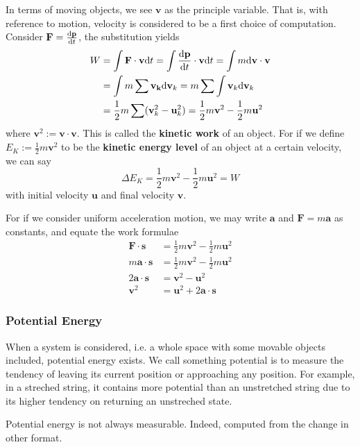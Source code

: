 \documentclass[12pt]{article}
\renewcommand{\d}[1]{\mathrm{d}{#1}}
\begin{document}
    In terms of moving objects, we see $\mathbf{v}$ as the principle variable. That is, with reference to motion, velocity is considered to be a first choice of computation. Consider $\mathbf{F}=\derivative{\mathbf{p}}{t}$, the substitution yields \begin{align*}
        W&=\int \mathbf{F\cdot v} \d{t} = \int \derivative{\mathbf{p}}{t} \cdot \mathbf{v} \d{t} = \int m\d{\mathbf{v}}\cdot \mathbf{v}\\
        &=\int m\sum \mathbf{v_k} \d{\mathbf{v}_k}=m\sum \int \mathbf{v}_k \d{\mathbf{v}_k}\\
        &=\frac{1}{2}m\sum (\mathbf{v}_k^2-\mathbf{u}_k^2) = \frac{1}{2}m\mathbf{v}^2 - \frac{1}{2}m\mathbf{u}^2
    \end{align*}
    where $\mathbf{v}^2:=\mathbf{v}\cdot\mathbf{v}$. This is called the \textbf{kinetic work} of an object. For if we define $E_K:=\frac{1}{2}m\mathbf{v}^2$ to be the \textbf{kinetic energy level} of an object at a certain velocity, we can say \[\Delta E_K = \frac{1}{2}m\mathbf{v}^2 - \frac{1}{2}m\mathbf{u}^2 = W\] with initial velocity $\mathbf{u}$ and final velocity $\mathbf{v}$.

    For if we consider uniform acceleration motion, we may write $\mathbf{a}$ and $\mathbf{F}=m\mathbf{a}$ as constants, and equate the work formulae \begin{align*}
        \mathbf{F}\cdot \mathbf{s} &= \frac{1}{2}m\mathbf{v}^2-\frac{1}{2}m\mathbf{u}^2\\
        m\mathbf{a\cdot s} &= \frac{1}{2}m\mathbf{v}^2-\frac{1}{2}m\mathbf{u}^2\\
        2\mathbf{a\cdot s} &= \mathbf{v}^2-\mathbf{u}^2\\
        \mathbf{v}^2&=\mathbf{u}^2+2\mathbf{a\cdot s}
    \end{align*}

    \subsubsection*{Potential Energy}

    When a system is considered, i.e. a whole space with some movable objects included, potential energy exists. We call something potential is to measure the tendency of leaving its current position or approaching any position. For example, in a streched string, it contains more potential than an unstretched string due to its higher tendency on returning an unstreched state.

    Potential energy is not always measurable. Indeed, computed from the change in other format.
\end{document}
